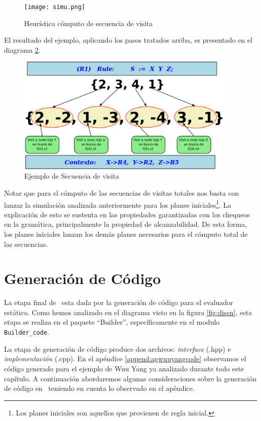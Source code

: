 \begin{figure}[h!]\centering
\texttt{[image: simu.png]}
\caption{\label{fig:simul}Heurística cómputo de secuencia de visita}
\end{figure}

\newpage

El resultado del ejemplo, aplicando los pasos tratados arriba, es presentado en el diagrama \ref{fig:resul_vis}.

\begin{figure}[h!]\centering
\includegraphics[width=300pt,height=160pt]{plan2seq.png}
\caption{\label{fig:resul_vis} Ejemplo de Secuencia de visita}
\end{figure}

Notar que para el cómputo de las secuencias de visitas totales nos basta con lanzar la simulación analizada anteriormente para los planes iniciales\footnote{Los planes iniciales son aquellos que provienen de regla inicial.}. La explicación de esto se sustenta en las propiedades garantizadas con los chequeos en la gramática, principalmente la propiedad de alcanzabilidad. De esta forma, los planes iniciales lanzan los demás planes necesarios para el cómputo total de las secuencias.

\section{Generación de Código}

La etapa final de \maggen\ esta dada por la generación de código para el evaluador estático. Como hemos analizado en el diagrama visto en la figura \ref{fig:disen}, esta etapa se realiza en el paquete ``Builder'', específicamente en el modulo \texttt{Builder\_code}.

La etapa de generación de código produce dos archivos: \textit{interface} (.hpp) e \textit{implementación} (.cpp). En el apéndice \ref{append:agwuuyangcode} observamos el código generado para el ejemplo de Wuu Yang ya analizado durante todo este capítulo.
A continuación abordaremos algunas consideraciones sobre la generación de código en \maggen\ teniendo en cuenta lo observado en el apéndice.

